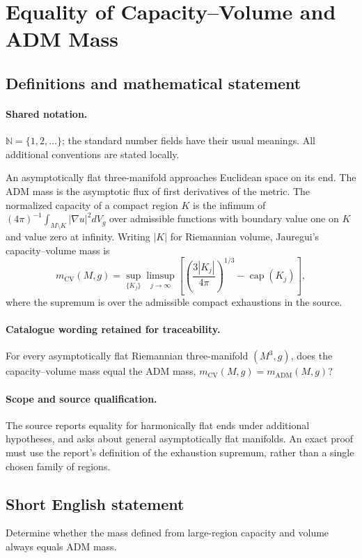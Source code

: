 \documentclass[11pt]{article}
\begin{document}
\section{Equality of Capacity–Volume and ADM Mass}\label{statement}

\subsection{Definitions and mathematical statement}

\paragraph{Shared notation.}$\mathbb N=\{1,2,\ldots\}$; the standard number fields have their usual meanings. All additional conventions are stated locally.


An asymptotically flat three-manifold approaches Euclidean space on its end. The ADM mass is the asymptotic flux of first derivatives of the metric. The normalized capacity of a compact region $K$ is the infimum of $(4\pi)^{-1}\int_{M\setminus K}|\nabla u|^2dV_g$ over admissible functions with boundary value one on $K$ and value zero at infinity. Writing $|K|$ for Riemannian volume, Jauregui's capacity--volume mass is
\[
m_{\mathrm{CV}}(M,g)=\sup_{\{K_j\}}\limsup_{j\to\infty}
\left[\left(\frac{3|K_j|}{4\pi}\right)^{1/3}-\operatorname{cap}(K_j)\right],
\]
where the supremum is over the admissible compact exhaustions in the source.

\paragraph{Catalogue wording retained for traceability.}
For every asymptotically flat Riemannian three-manifold $(M^3,g)$, does the capacity–volume mass equal the ADM mass, $m_{\mathrm{CV}}(M,g)=m_{\mathrm{ADM}}(M,g)$?

\paragraph{Scope and source qualification.}The source reports equality for harmonically flat ends under additional hypotheses, and asks about general asymptotically flat manifolds. An exact proof must use the report's definition of the exhaustion supremum, rather than a single chosen family of regions.
\subsection{Short English statement}
Determine whether the mass defined from large-region capacity and volume always equals ADM mass.
\end{document}
